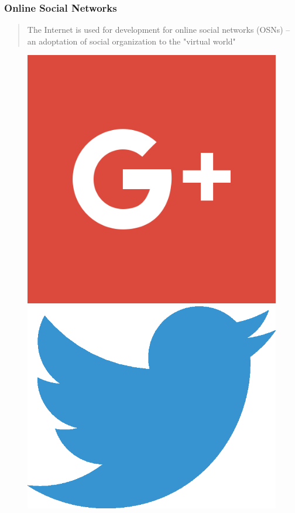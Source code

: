 \documentclass[8pt]{beamer}
\begin{document}
  \begin{frame}
  	\frametitle{Online Social Networks}
  	
  	\vfill
  	
  	\begin{quotation}
  		The Internet is used for development for online social networks (OSNs) -- an adoptation of social organization to the "virtual world"
  	\end{quotation}
  	
  	\vfill
  	
  	\begin{figure}
  		\begin{minipage}{0.25\textwidth}
  			\includegraphics[scale=0.08]{asset/google-plus-logo.jpg}
  		\end{minipage}
  		\begin{minipage}{0.25\textwidth}
  			\includegraphics[scale=0.2]{asset/twitter-logo.eps}

\end{minipage}
\end{figure}
\end{frame}
\end{document}
